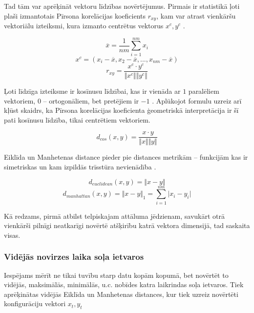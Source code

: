 \documentclass[12pt, a4paper]{article}
\numberwithin{equation}{section} %
\begin{document}
Tad tām var aprēķināt vektoru līdzības novērtējumus. Pirmais ir statistikā ļoti plaši izmantotais Pīrsona korelācijas koeficients $r_{xy}$, kam var atrast vienkāršu vektoriālu izteiksmi, kura izmanto centrētus vektorus $x^c, y^c$ \cite{pearson_vector}. 

\begin{equation}
    \overline{x} = \frac{1}{nm} \sum_{i=1}^{nm} x_i
\end{equation}
\begin{equation}
    x^c = (x_i - \overline{x}, x_2 - \overline{x}, ..., x_{nm} - \overline{x})
\end{equation}
\begin{equation}
    r_{xy} = \frac{x^c \cdot y^c}{\Vert x^c \Vert \Vert y^c \Vert}
\end{equation}

Ļoti līdzīga izteiksme ir kosīnusu līdzībai, kas ir vienāda ar $1$ paralēliem vektoriem, $0$ -- ortogonāliem, bet pretējiem ir $-1$ \cite{cosine_sim}. Aplūkojot formulu uzreiz arī kļūst skaidrs, ka Pīrsona korelācijas koeficienta ģeometriskā interpretācija ir šī pati kosīnusu līdzība, tikai centrētiem vektoriem.

\begin{equation}
    d_{cos}(x,y) = \frac{x \cdot y}{\Vert x \Vert \Vert y \Vert}
\end{equation}

Eiklīda un Manhetenas distance pieder pie distances metrikām -- funkcijām kas ir simetriskas un kam izpildās trīsstūra nevienādība \cite{metrics}.

\begin{equation}
    d_{euclidean}(x,y) = \Vert x - y \Vert
\end{equation}
\begin{equation}
    d_{manhattan}(x,y) = \Vert x - y \Vert_1 = \sum_{i=1}^{nm} \vert x_i - y_i \vert
\end{equation}

Kā redzams, pirmā atbilst telpiskajam attāluma jēdzienam, savukārt otrā vienkārši pilnīgi neatkarīgi novērtē atšķirību katrā vektora dimensijā, tad saskaita visas.

\subsubsection{Vidējās novirzes laika soļa ietvaros}

Iespējams mērīt ne tikai tuvību starp datu kopām kopumā, bet novērtēt to vidējās, maksimālās, minimālās, u.c. nobīdes katra laikrindas soļa ietvaros. Tiek aprēķinātas vidējās Eiklīda un Manhetenas distances, kur tiek uzreiz novērtēti konfigurāciju vektori $x_t, y_t$
\end{document}
